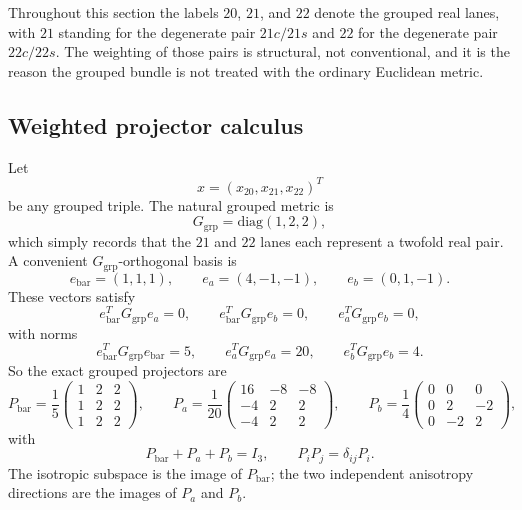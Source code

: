 \documentclass[11pt]{article}
\theoremstyle{definition}
\newcommand{\diag}{\mathrm{diag}}
\begin{document}
Throughout this section the labels $20$, $21$, and $22$ denote the grouped real lanes, with $21$ standing for the degenerate pair $21c/21s$ and $22$ for the degenerate pair $22c/22s$. The weighting of those pairs is structural, not conventional, and it is the reason the grouped bundle is not treated with the ordinary Euclidean metric.

\subsection{Weighted projector calculus}

Let
\[
 x=(x_{20},x_{21},x_{22})^T
\]
be any grouped triple. The natural grouped metric is
\begin{equation}
G_{\mathrm{grp}}=\diag(1,2,2),
\label{eq:grouped-metric}
\end{equation}
which simply records that the $21$ and $22$ lanes each represent a twofold real pair. A convenient $G_{\mathrm{grp}}$-orthogonal basis is
\begin{equation}
 e_{\mathrm{bar}}=(1,1,1),
 \qquad
 e_a=(4,-1,-1),
 \qquad
 e_b=(0,1,-1).
\label{eq:grouped-basis}
\end{equation}
These vectors satisfy
\[
 e_{\mathrm{bar}}^T G_{\mathrm{grp}} e_a=0,
 \qquad
 e_{\mathrm{bar}}^T G_{\mathrm{grp}} e_b=0,
 \qquad
 e_a^T G_{\mathrm{grp}} e_b=0,
\]
with norms
\[
 e_{\mathrm{bar}}^T G_{\mathrm{grp}} e_{\mathrm{bar}}=5,
 \qquad
 e_a^T G_{\mathrm{grp}} e_a=20,
 \qquad
 e_b^T G_{\mathrm{grp}} e_b=4.
\]
So the exact grouped projectors are
\begin{equation}
P_{\mathrm{bar}}=\frac15
\begin{pmatrix}
1&2&2\\
1&2&2\\
1&2&2
\end{pmatrix},
\qquad
P_a=\frac1{20}
\begin{pmatrix}
16&-8&-8\\
-4&2&2\\
-4&2&2
\end{pmatrix},
\qquad
P_b=\frac14
\begin{pmatrix}
0&0&0\\
0&2&-2\\
0&-2&2
\end{pmatrix},
\label{eq:grouped-projectors}
\end{equation}
with
\begin{equation}
P_{\mathrm{bar}}+P_a+P_b=I_3,
\qquad
P_iP_j=\delta_{ij}P_i.
\label{eq:grouped-projector-algebra}
\end{equation}
The isotropic subspace is the image of $P_{\mathrm{bar}}$; the two independent anisotropy directions are the images of $P_a$ and $P_b$.
\end{document}
